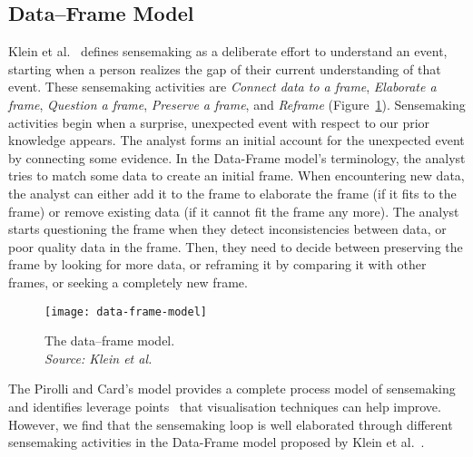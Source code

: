\subsection{Data--Frame Model}
Klein et al.~\cite{Klein2003} defines sensemaking as a deliberate effort to understand an event, starting when a person realizes the gap of their current understanding of that event. These sensemaking activities are \emph{Connect data to a frame}, \emph{Elaborate a frame}, \emph{Question a frame}, \emph{Preserve a frame}, and \emph{Reframe} (Figure~\ref{fig:data-frame-model}). Sensemaking activities begin when a surprise, unexpected event with respect to our prior knowledge appears. The analyst forms an initial account for the unexpected event by connecting some evidence. In the Data-Frame model's terminology, the analyst tries to match some data to create an initial frame. When encountering new data, the analyst can either add it to the frame to elaborate the frame (if it fits to the frame) or remove existing data (if it cannot fit the frame any more). The analyst starts questioning the frame when they detect inconsistencies between data, or poor quality data in the frame. Then, they need to decide between preserving the frame by looking for more data, or reframing it by comparing it with other frames, or seeking a completely new frame. 

\begin{figure}[!htb]
	\centering
	\texttt{[image: data-frame-model]}
	\caption{The data--frame model.
		\\\emph{Source: Klein et al.~\cite{Klein2003}}}
	\label{fig:data-frame-model}
\end{figure}

The Pirolli and Card's model provides a complete process model of sensemaking and identifies leverage points~\cite{Pirolli2005} that visualisation techniques can help improve. However, we find that the sensemaking loop is well elaborated through different sensemaking activities in the Data-Frame model proposed by Klein et al.~\cite{Klein2003}.